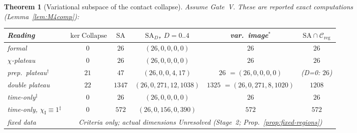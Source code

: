 \documentclass{article}
\newtheorem{theorem}[proposition]{Theorem}
\theoremstyle{remark}
\newcommand{\chiI}{\chi_{\mathrm I}}
\newcommand{\Creg}{\mathcal C_{\mathrm{reg}}}
\newcommand{\Coll}{\mathrm{Collapse}}
\begin{document}
\begin{theorem}[Variational subspace of the contact collapse]
\label{thm:M4}
Assume Gate~V. These are reported exact computations (Lemma~\ref{lem:M4comp}):
\begin{center}
\small
\begin{tabular}{lccccc}
\hline
Reading & $\ker\Coll$ & $\mathrm{SA}$ & $\mathrm{SA}_D$, $D=0..4$ & var.\ image$^\ast$ & $\mathrm{SA}\cap\Creg$\\
\hline
formal & $0$ & $26$ & $(26,0,0,0,0)$ & $26$ & $26$\\
$\chi$-plateau & $0$ & $26$ & $(26,0,0,0,0)$ & $26$ & $26$\\
prep.\ plateau$^\dagger$ & $21$ & $47$ & $(26,0,0,4,17)$ & $26$ $=(26,0,0,0,0)$ & (D=0: $26$)\\
double plateau & $22$ & $1347$ & $(26,0,271,12,1038)$ & $1325$ $=(26,0,271,8,1020)$ & $1208$\\
time-only$^\ddagger$ & $0$ & $26$ & $(26,0,0,0,0)$ & $26$ & $26$\\
time-only, $\chiI\equiv1$$^\ddagger$ & $0$ & $572$ & $(26,0,156,0,390)$ & $572$ & $572$\\
fixed data & \multicolumn{5}{c}{Criteria only; actual dimensions Unresolved (Stage~2; Prop.~\ref{prop:fixed-regions})}\\
\hline
\end{tabular}
\normalsize


\end{center}
\end{theorem}
\end{document}
